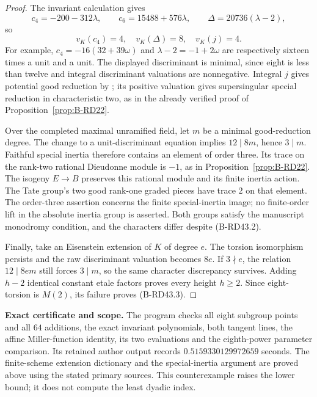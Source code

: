 \begin{proof}
The invariant calculation gives
\[
 c_4=-200-312\lambda,\qquad
 c_6=15488+576\lambda,\qquad
 \Delta=20736(\lambda-2),
\]
so
\[
                     v_K(c_4)=4,\quad v_K(\Delta)=8,
                     \quad v_K(j)=4.
                                                        \tag{B-RD43.7}
\]
For example, $c_4=-16(32+39\omega)$ and
$\lambda-2=-1+2\omega$ are respectively sixteen times a unit
and a unit. The displayed discriminant is minimal, since eight
is less than twelve and integral discriminant valuations are
nonnegative. Integral $j$ gives potential good reduction by
\citet[Section~2, p.~496]{SerreTate1968Good}; its positive valuation
gives supersingular special reduction in characteristic two,
as in the already verified proof of Proposition~\ref{prop:B-RD22}.

Over the completed maximal unramified field, let $m$ be a minimal
good-reduction degree. The change to a unit-discriminant equation
implies $12\mid8m$, hence $3\mid m$. Faithful special inertia
therefore contains an element of order three. Its trace on the
rank-two rational Dieudonne module is $-1$, as in
Proposition~\ref{prop:B-RD22}. The isogeny $E\to B$ preserves this
rational module and its finite inertia action. The Tate group's
two good rank-one graded pieces have trace $2$ on that element.
The order-three assertion concerns the finite special-inertia image;
no finite-order lift in the absolute inertia group is asserted.
Both groups satisfy the manuscript monodromy condition, and the
characters differ despite (B-RD43.2).

Finally, take an Eisenstein extension of $K$ of degree $e$.
The torsion isomorphism persists and the raw discriminant valuation
becomes $8e$. If $3\nmid e$, the relation $12\mid8em$ still
forces $3\mid m$, so the same character discrepancy survives.
Adding $h-2$ identical constant etale factors proves every height
$h\ge2$. Since eight-torsion is $M(2)$, its failure proves
(B-RD43.3).
\end{proof}

\par\smallskip\noindent\textbf{Exact certificate and scope.}
The program  checks all eight
subgroup points and all $64$ additions, the exact invariant
polynomials, both tangent lines, the affine Miller-function identity,
its two evaluations and the eighth-power parameter comparison.
Its retained author output records $0.5159330129972659$ seconds.
The finite-scheme extension dictionary and the special-inertia
argument are proved above using the stated primary sources.
This counterexample raises the lower bound; it does not compute
the least dyadic index.

